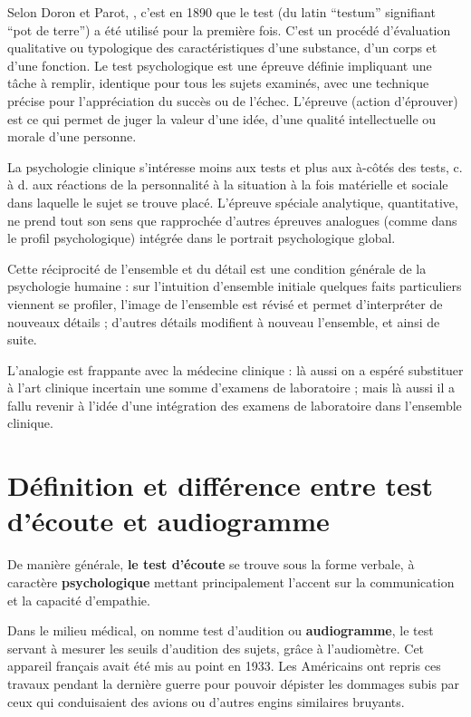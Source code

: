 Selon Doron et Parot, \autocite {doronparot}, c'est en 1890 que le test (du latin ``testum''
signifiant ``pot de terre'') a été utilisé pour la
première fois. C'est un procédé d'évaluation qualitative ou
typologique des caractéristiques d'une substance, d'un corps et d'une
fonction.
Le test psychologique est une épreuve définie impliquant une tâche à
remplir, identique pour tous les sujets examinés, avec une technique
précise pour l'appréciation du succès ou de l'échec.
L'épreuve (action d'éprouver) est ce qui permet de juger la valeur
d'une idée, d'une qualité intellectuelle ou morale d'une personne.

La psychologie clinique s’intéresse moins
aux tests et plus aux à-côtés des tests, c. à d. aux réactions de la
personnalité à la situation à la fois matérielle et sociale dans
laquelle le sujet se trouve placé. L’épreuve spéciale analytique,
quantitative, ne prend tout son sens que rapprochée d’autres épreuves
analogues (comme dans le profil psychologique) intégrée dans le
portrait psychologique global.

Cette réciprocité de l’ensemble et du détail est une condition générale de la psychologie humaine : sur l’intuition d’ensemble initiale quelques faits particuliers viennent se profiler, l’image de l’ensemble est révisé et permet d’interpréter de nouveaux détails ; d’autres détails modifient à nouveau l’ensemble, et ainsi de suite.


L’analogie est frappante avec la médecine clinique : là aussi on a
espéré substituer à l’art clinique incertain une somme d’examens de
laboratoire ; mais là aussi il a fallu revenir à l’idée d’une
intégration des examens de laboratoire dans l’ensemble clinique.



\section{Définition et différence entre test d'écoute et audiogramme}

De manière générale, \textbf{le test d'écoute} se trouve sous la forme verbale,
à caractère
\textbf{psychologique} mettant principalement l'accent sur la communication
et la capacité d'empathie.

Dans le milieu médical, on nomme test d'audition ou \textbf{audiogramme}, le test servant à mesurer les seuils d'audition des sujets, grâce à l'audiomètre. Cet
appareil français avait été mis au point en 1933. Les Américains
ont repris ces travaux pendant la dernière guerre pour pouvoir dépister
les dommages subis par ceux qui conduisaient des avions ou d'autres
engins similaires bruyants.



